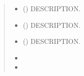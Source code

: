 \documentclass[letterpaper,10pt,english]{sphinxmanual}
\begin{document}
\begin{fulllineitems}
\label{\detokenize{MUFBVAR:MUFBVAR.mfbvar_funcs.prior_init}}
\pysigstartsignatures
{}
\pysigstopsignatures\begin{quote}\begin{description}
\begin{itemize}
\item {} 
\sphinxAtStartPar
{} () \textendash{} DESCRIPTION.

\item {} 
\sphinxAtStartPar
{} () \textendash{} DESCRIPTION.

\item {} 
\sphinxAtStartPar
{} () \textendash{} DESCRIPTION.

\end{itemize}

\sphinxAtStartPar
\begin{itemize}
\item {} 
\sphinxAtStartPar
{}

\item {} 
\sphinxAtStartPar
{}

\end{itemize}


\end{description}\end{quote}

\end{fulllineitems}

\end{document}
